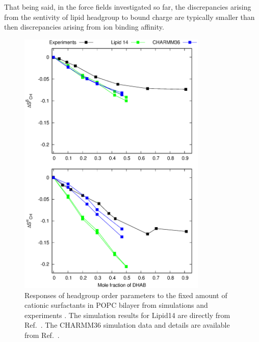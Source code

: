 \documentclass[journal=jpcbfk,manuscript=article]{achemso}
\begin{document}
That being said, in the force fields investigated so far, the discrepancies arising from the sentivity of lipid headgroup to
bound charge are typically smaller than then discrepancies arising from ion binding affinity.
\begin{figure}[]
  \centering
  \includegraphics[width=9.0cm]{../Figs/HGopsDHMDMAB.eps}
  \caption{\label{CHANGESwithDHMDMAB}
  Responses of headgroup order parameters to the fixed amount of cationic surfactants in
  POPC bilayer from simulations and experiments \cite{scherer89}.
  The simulation results for Lipid14 are directly from Ref.~.
  The CHARMM36 simulation data and details are available from Ref.~.
}
\end{figure}

\pagebreak
\end{document}
